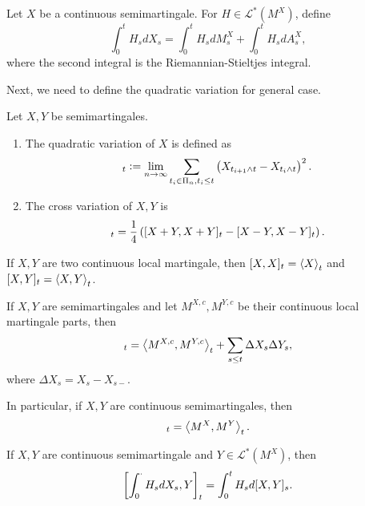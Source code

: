 \begin{defn}
    Let $X$ be a continuous semimartingale. For $H \in \mathcal{L}^*(M^X)$, define
    \begin{equation*}
        \int_0^t H_s dX_s = \int_0^t H_s dM^X_s + \int_0^tH_s dA^X_s,
    \end{equation*}
    where the second integral is the Riemannian-Stieltjes integral.
\end{defn}

\noindent Next, we need to define the quadratic variation for general case.
\begin{defn}
    Let $X,Y$ be semimartingales.
    \begin{enumerate}[label=(\arabic{*})]
        \item The quadratic variation of $X$ is defined as
        \begin{equation*}
            [X,X]_t \defeq \lim_{n \sto \infty} \sum_{t_i \in \Pi_n,t_i \leq t} \bc{X_{t_{i+1} \wedge t} - X_{t_i \wedge t}}^2.
        \end{equation*}

        \item The cross variation of $X,Y$ is
        \begin{equation*}
            [X,Y]_t = \frac{1}{4}\bc{[X+Y,X+Y]_t - [X-Y,X-Y]_t}.
        \end{equation*}
    \end{enumerate}
\end{defn}
\begin{rmk}
    If $X,Y$ are two continuous local martingale, then $[X,X]_t = \left\langle X \right\rangle_t$ and $[X,Y]_t = \left\langle X,Y \right\rangle_t$.
\end{rmk}

\begin{thm}
    If $X,Y$ are semimartingales and let $M^{X,c},M^{Y,c}$ be their continuous local martingale parts, then
    \begin{equation*}
        [X,Y]_t = \inn{M^{X,c},M^{Y,c}}_t + \sum_{s\leq t} \Delta X_s\Delta Y_s,
    \end{equation*}
    where $\Delta X_s = X_s - X_{s-}$.
\end{thm}
\begin{rmk}
    In particular, if $X,Y$ are continuous semimartingales, then
    \begin{equation*}
        [X,Y]_t = \inn{M^X,M^Y}_t.
    \end{equation*}
\end{rmk}

\begin{cor}
    If $X,Y$ are continuous semimartingale and $Y \in \mathcal{L}^*(M^X)$, then
    \begin{equation*}
        \left[\int_0^\cdot H_s dX_s,Y\right]_t = \int_0^t H_s d[X,Y]_s.
    \end{equation*}
\end{cor}

